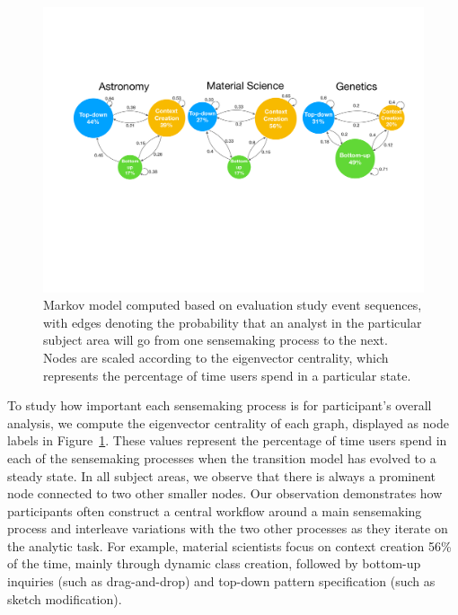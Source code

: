 \begin{figure}[h!]
  \includegraphics[width=\linewidth]{figures/transition.pdf}
  \caption{Markov model computed based on evaluation study event sequences, with edges denoting the probability that an analyst in the particular subject area will go from one sensemaking process to the next. Nodes are scaled according to the eigenvector centrality, which represents the percentage of time users spend in a particular state.}\label{fig:transition}
\end{figure}
\par To study how important each sensemaking process is for participant's overall analysis, we compute the eigenvector centrality of each graph, displayed as node labels in Figure~\ref{fig:transition}. These values represent the percentage of time users spend in each of the sensemaking processes when the transition model has evolved to a steady state. In all subject areas, we observe that there is always a prominent node connected to two other smaller nodes. Our observation demonstrates how participants often construct a central workflow around a main sensemaking process and interleave variations with the two other processes as they iterate on the analytic task. For example, material scientists focus on context creation 56\% of the time, mainly through dynamic class creation, followed by bottom-up inquiries (such as drag-and-drop) and top-down pattern specification (such as sketch modification). 
